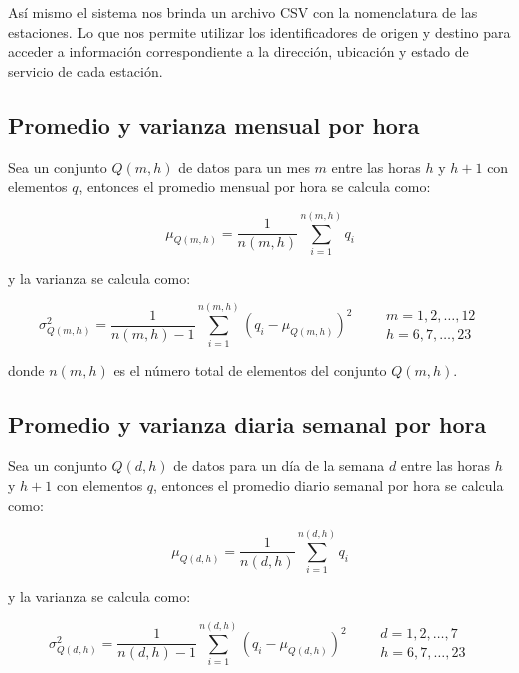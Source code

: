 Así mismo el sistema nos brinda un archivo CSV con la nomenclatura de las estaciones. Lo que nos permite utilizar los identificadores de origen y destino para acceder a información correspondiente a la dirección, ubicación y estado de servicio de cada estación.

\subsection{Promedio y varianza mensual por hora}

Sea un conjunto $Q(m,h)$ de datos para un mes $m$  entre las horas $h$ y $h+1$ con elementos $q$, entonces el promedio mensual por hora se calcula como:

\begin{equation}
    \mu_{Q(m,h)} = \frac{1}{n(m,h)} \sum_{i=1}^{n(m,h)} q_i \label{eq:monthly_hourly_mean}
\end{equation}

y la varianza se calcula como:

\begin{equation}
    \sigma^2_{Q(m,h)} = \frac{1}{n(m,h)-1} \sum_{i=1}^{n(m,h)} (q_i - \mu_{Q(m,h)})^2 \qquad \begin{matrix}
        m=1,2,\dots,12 \\
        h=6,7,\dots,23
    \end{matrix} \label{eq:monthly_hourly_var}
\end{equation}

donde $n(m,h)$ es el número total de elementos del conjunto $Q(m,h)$.

\subsection{Promedio y varianza diaria semanal por hora}

Sea un conjunto $Q(d,h)$ de datos para un día de la semana $d$  entre las horas $h$ y $h+1$ con elementos $q$, entonces el promedio diario semanal por hora se calcula como:

\begin{equation}
    \mu_{Q(d,h)} = \frac{1}{n(d,h)} \sum_{i=1}^{n(d,h)} q_i \label{eq:daily_hourly_mean}
\end{equation}

y la varianza se calcula como:

\begin{equation}
    \sigma^2_{Q(d,h)} = \frac{1}{n(d,h)-1} \sum_{i=1}^{n(d,h)} (q_i - \mu_{Q(d,h)})^2 \qquad \begin{matrix}
        d=1,2,\dots,7 \\
        h=6,7,\dots,23
    \end{matrix} \label{eq:daily_hourly_var}
\end{equation}

